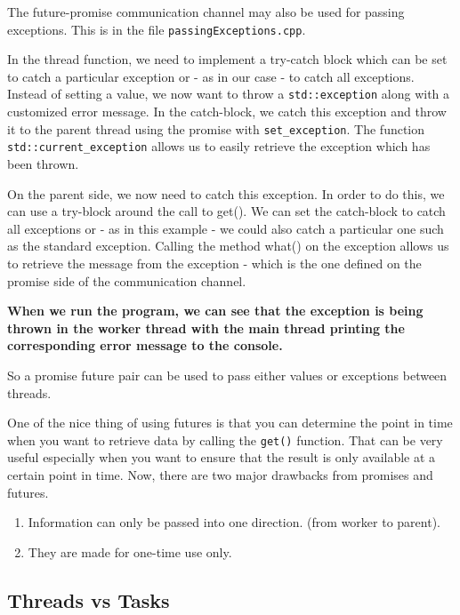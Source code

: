 \documentclass[11pt, a4paper]{article}
\begin{document}
The future-promise communication channel may also be used for passing exceptions. This is in the file \texttt{passingExceptions.cpp}.

In the thread function, we need to implement a try-catch block which can be set to catch a particular exception or - as in our case - to catch all exceptions. Instead of setting a value, we now want to throw a \texttt{std::exception} along with a customized error message. In the catch-block, we catch this exception and throw it to the parent thread using the promise with \texttt{set\_exception}. The function \texttt{std::current\_exception} allows us to easily retrieve the exception which has been thrown.

On the parent side, we now need to catch this exception. In order to do this, we can use a try-block around the call to get(). We can set the catch-block to catch all exceptions or - as in this example - we could also catch a particular one such as the standard exception. Calling the method what() on the exception allows us to retrieve the message from the exception - which is the one defined on the promise side of the communication channel.

\textbf{When we run the program, we can see that the exception is being thrown in the worker thread with the main thread printing the corresponding error message to the console.}

So a promise future pair can be used to pass either values or exceptions between threads.


One of the nice thing of using futures is that you can determine the point in time when you want to retrieve data by calling the \texttt{get()}  function. That can be very useful especially when you want to ensure that the result is only available at a certain point in time. Now, there are two major drawbacks from promises and futures.

\begin{enumerate}
	\item Information can only be passed into one direction. (from worker to parent).
	\item They are made for one-time use only. 
\end{enumerate}



\subsection{Threads vs Tasks}%
\label{sub:threads_vs_tasks}
\end{document}

